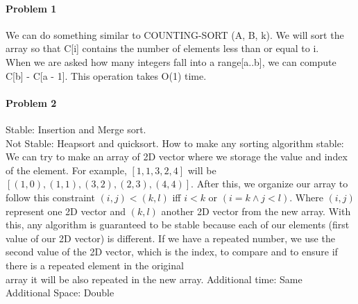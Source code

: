 \documentclass[11pt]{article}
\begin{document}
\MakeScribeTop


\paragraph{\noindent\textbf{\LARGE{Problem 1}}}


\begin{flushleft}
    We can do something similar to COUNTING-SORT (A, B, k). We will sort the array so that
    C[i] contains the number of elements less than or equal to i.
    \\
    When we are asked how many integers fall into a range[a..b], we can compute C[b] - C[a - 1]. This operation takes
    O(1) time.
\end{flushleft}   

\paragraph{\noindent\textbf{\LARGE{Problem 2}}}

\begin{flushleft}
    Stable: Insertion and Merge sort.
    \\
    Not Stable: Heapsort and quicksort.
    \newline
    \newline
    How to make any sorting algorithm stable:
    \newline
    \newline
    We can try to make an array of 2D vector where we storage the value and index of the element.
    \newline
    \newline
    For example, $[1, 1, 3, 2, 4]$ will be $[(1,0),(1,1), (3,2), (2,3), (4,4)]$.
    \newline
    \newline
    After this, we organize our array to follow this constraint $(i,j) < (k,l)$ iff $i < k$ or $(i = k \wedge j < l)$. 
    Where $(i,j)$ represent one 2D vector and $(k,l)$ another 2D vector from the new array.
    \newline
    \newline
    With this, any algorithm is guaranteed to be stable because each of our elements (first value of our 2D vector) is different. 
    If we have a repeated number, we use the second value of the 2D vector,
    which is the index, to compare and to ensure if there is a repeated element in the original\\ array it will be also repeated in the new array.
    \newline
    \newline
    Additional time: Same 
    \\
    Additional Space: Double   
\end{flushleft}  
\end{document}
